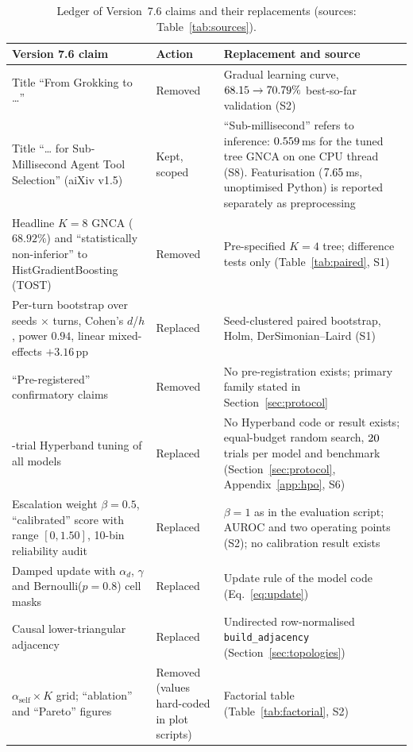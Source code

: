 \documentclass[10pt,twocolumn,letterpaper]{article}
\begin{document}
\begin{table}[p]
\centering
\scriptsize
\setlength{\tabcolsep}{3pt}
\caption{Ledger of Version~7.6 claims and their replacements (sources: Table~\ref{tab:sources}).}\label{tab:ledger}
\begin{tabularx}{\textwidth}{@{}>{\raggedright\arraybackslash}p{5.6cm}>{\raggedright\arraybackslash}p{2.2cm}>{\raggedright\arraybackslash}X@{}}
\toprule
Version 7.6 claim & Action & Replacement and source \\
\midrule
Title ``From Grokking to \ldots'' & Removed & Gradual learning curve, $68.15\to70.79\%$ best-so-far validation (S2) \\
Title ``\ldots{} for Sub-Millisecond Agent Tool Selection'' (aiXiv v1.5) & Kept, scoped & ``Sub-millisecond'' refers to inference: $0.559$\,ms for the tuned tree GNCA on one CPU thread (S8). Featurisation ($7.65$\,ms, unoptimised Python) is reported separately as preprocessing \\
Headline $K{=}8$ GNCA ($68.92\%$) and ``statistically non-inferior'' to HistGradientBoosting (TOST) & Removed & Pre-specified $K{=}4$ tree; difference tests only (Table~\ref{tab:paired}, S1) \\
Per-turn bootstrap over seeds $\times$ turns, Cohen's $d$/$h$, power $0.94$, linear mixed-effects $+3.16$\,pp & Replaced & Seed-clustered paired bootstrap, Holm, DerSimonian--Laird (S1) \\
``Pre-registered'' confirmatory claims & Removed & No pre-registration exists; primary family stated in Section~\ref{sec:protocol} \\
50-trial Hyperband tuning of all models & Replaced & No Hyperband code or result exists; equal-budget random search, $20$ trials per model and benchmark (Section~\ref{sec:protocol}, Appendix~\ref{app:hpo}, S6) \\
Escalation weight $\beta{=}0.5$, ``calibrated'' score with range $[0,1.50]$, 10-bin reliability audit & Replaced & $\beta{=}1$ as in the evaluation script; AUROC and two operating points (S2); no calibration result exists \\
Damped update with $\alpha_d$, $\gamma$ and Bernoulli($p{=}0.8$) cell masks & Replaced & Update rule of the model code (Eq.~\eqref{eq:update}) \\
Causal lower-triangular adjacency & Replaced & Undirected row-normalised \texttt{build\_adjacency} (Section~\ref{sec:topologies}) \\
$\alpha_{\text{self}}\times K$ grid; ``ablation'' and ``Pareto'' figures & Removed (values hard-coded in plot scripts) & Factorial table (Table~\ref{tab:factorial}, S2) \\

\end{tabularx}
\end{table}
\end{document}
